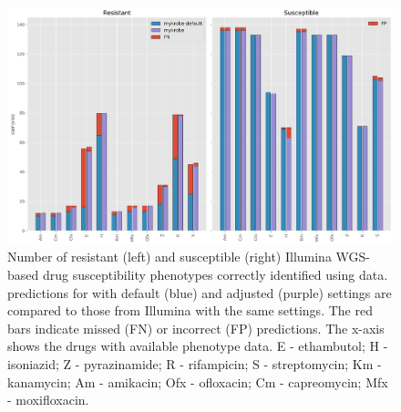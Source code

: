 \begin{figure}
\begin{center}
\includegraphics[width=0.90\columnwidth]{Appendix2/Figs/mykrobe_settings_illumina_concordance.png}
\caption{{Number of resistant (left) and susceptible (right) Illumina WGS-based drug susceptibility phenotypes correctly identified using \ont{} data. \ont{} predictions for \mykrobe{} with default (blue) and adjusted (purple) settings are compared to those from Illumina with the same settings. The red bars indicate missed (FN) or incorrect (FP) predictions. The x-axis shows the drugs with available phenotype data. E - ethambutol; H - isoniazid; Z - pyrazinamide; R - rifampicin; S - streptomycin; Km - kanamycin; Am - amikacin; Ofx - ofloxacin; Cm - capreomycin; Mfx - moxifloxacin.
{\label{fig:mykrobe-settings-geno}}
}}
\end{center}
\end{figure}


